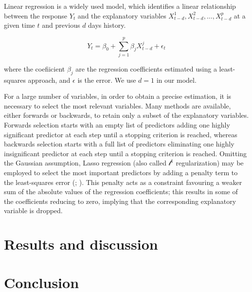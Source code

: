 \documentclass[12pt]{article}
\begin{document}
Linear regression is a widely used model, which identifies a linear relationship between the response $Y_t$ and the explanatory variables $X_{t-d}^1, X_{t-d}^2,\ldots,X_{t-d}^p$ at a given time $t$ and previous $d$ days history.

\begin{equation}
	Y_{t} = \beta_0+\sum_{j=1}^p \beta_j X_{t-d}^j + \epsilon_t
\end{equation}

where the coefiicient $\beta_j$ are the regression coefficients estimated using a least-squares approach, and $\epsilon$ is the error. We use $d=1$ in our model.

For a large number of variables, in order to obtain a precise estimation, it is necessary to select the most relevant variables. Many methods are available, either forwards or backwards, to retain only a subset of the explanatory variables. Forwards selection starts with an empty list of predictors adding one highly significant predictor at each step until a stopping criterion is reached, whereas backwards selection starts with a full list of predictors eliminating one highly insignificant predictor at each step until a stopping criterion is reached. Omitting the Gaussian assumption, Lasso regression (also called $\mathcal{l}^1$ regularization) may be employed to select the most important predictors by adding a penalty term to the least-squares error (\cite{ISL2}; \cite{Tibshirani1996}). This penalty acts as a constraint favouring a weaker sum of the absolute values of the regression coefficients; this results in some of the coefficients reducing to zero, implying that the corresponding explanatory variable is dropped.

\section{Results and discussion}
\section{Conclusion}


\end{document}
